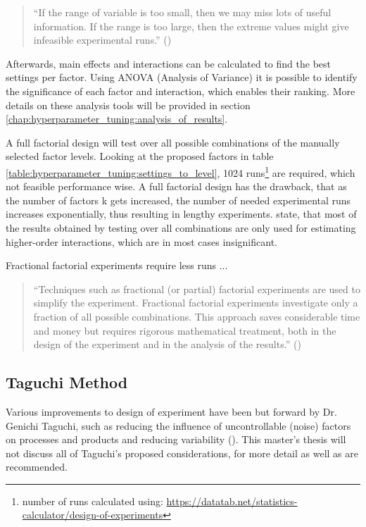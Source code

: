 \begin{quote}
	\begin{em}
		\enquote{If the range of variable is too small, then we may miss lots of useful information. If the range is too large, then the extreme values might give infeasible experimental runs.} (\cite{yang_design_2009})
	\end{em}
\end{quote}

Afterwards, main effects and interactions can be calculated to find the best settings per factor. Using ANOVA (Analysis of Variance) it is possible to identify the significance of each factor and interaction, which enables their ranking. More details on these analysis tools will be provided in section \ref{chap:hyperparameter_tuning:analysis_of_results}.

A full factorial design will test over all possible combinations of the manually selected factor levels. Looking at the proposed factors in table \ref{table:hyperparameter_tuning:settings_to_level}, 1024 runs\footnote{number of runs calculated using: \url{https://datatab.net/statistics-calculator/design-of-experiments}} are required, which not feasible performance wise. A full factorial design has the drawback, that as the number of factors k gets increased, the number of needed experimental runs increases exponentially, thus resulting in lengthy experiments. \cite{yang_design_2009} state, that most of the results obtained by testing over all combinations are only used for estimating higher-order interactions, which are in most cases insignificant.

Fractional factorial experiments require less runs ... 

\begin{quote}
	\begin{em}
		\enquote{Techniques such as fractional (or partial) factorial experiments are used to simplify the experiment. Fractional factorial experiments investigate only a fraction of all possible combinations. This approach saves considerable time and money but requires rigorous mathematical treatment, both in the design of the experiment and in the analysis of the results.} (\cite{roy_primer_1990})
	\end{em}
\end{quote}


\subsection{Taguchi Method}
Various improvements to design of experiment have been but forward by Dr. Genichi Taguchi, such as reducing the influence of uncontrollable (noise) factors on processes and products and reducing variability (\cite{roy_primer_1990}). This master's thesis will not discuss all of Taguchi's proposed considerations, for more detail \cite{roy_primer_1990} as well as \cite{yang_design_2009} are recommended.

